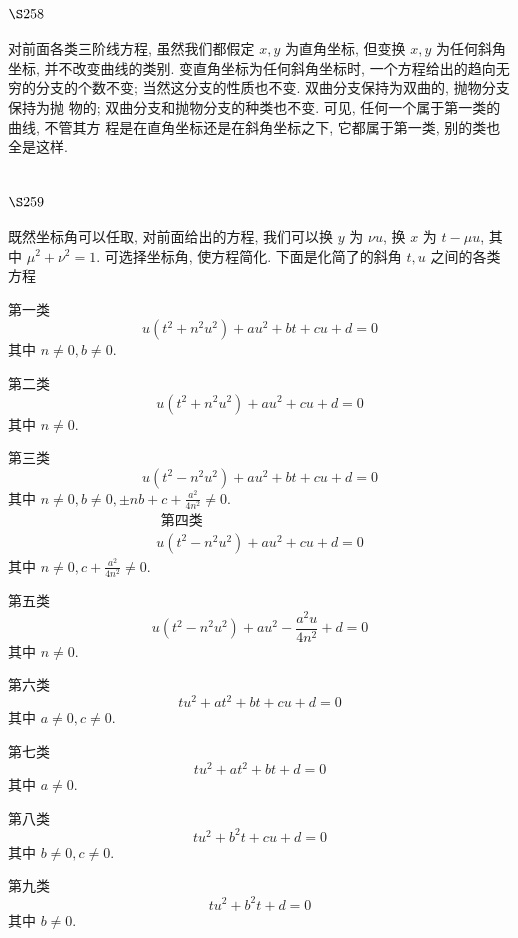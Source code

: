 \section{$\S 258$}

对前面各类三阶线方程, 虽然我们都假定 $x, y$ 为直角坐标, 但变换 $x, y$ 为任何斜角 坐标, 并不改变曲线的类别. 变直角坐标为任何斜角坐标时, 一个方程给出的趋向无穷的分支的个数不变; 当然这分支的性质也不变. 双曲分支保持为双曲的, 抛物分支保持为抛 物的; 双曲分支和抛物分支的种类也不变. 可见, 任何一个属于第一类的曲线, 不管其方 程是在直角坐标还是在斜角坐标之下, 它都属于第一类, 别的类也全是这样.

\section{$\S 259$}

既然坐标角可以任取, 对前面给出的方程, 我们可以换 $y$ 为 $\nu u$, 换 $x$ 为 $t-\mu u$, 其中 $\mu^{2}+\nu^{2}=1$. 可选择坐标角, 使方程简化. 下面是化简了的斜角 $t, u$ 之间的各类方程

第一类
\[
u\left(t^{2}+n^{2} u^{2}\right)+a u^{2}+b t+c u+d=0
\]
其中 $n \neq 0, b \neq 0$.

第二类
\[
u\left(t^{2}+n^{2} u^{2}\right)+a u^{2}+c u+d=0
\]
其中 $n \neq 0$.

第三类
\[
u\left(t^{2}-n^{2} u^{2}\right)+a u^{2}+b t+c u+d=0
\]
其中 $n \neq 0, b \neq 0, \pm n b+c+\frac{a^{2}}{4 n^{2}} \neq 0$.
\[
\begin{gathered}
\text { 第四类 } \\
u\left(t^{2}-n^{2} u^{2}\right)+a u^{2}+c u+d=0
\end{gathered}
\]
其中 $n \neq 0, c+\frac{a^{2}}{4 n^{2}} \neq 0$.

第五类
\[
u\left(t^{2}-n^{2} u^{2}\right)+a u^{2}-\frac{a^{2} u}{4 n^{2}}+d=0
\]
其中 $n \neq 0$.

第六类
\[
t u^{2}+a t^{2}+b t+c u+d=0
\]
其中 $a \neq 0, c \neq 0$.

第七类
\[
t u^{2}+a t^{2}+b t+d=0
\]
其中 $a \neq 0$.

第八类
\[
t u^{2}+b^{2} t+c u+d=0
\]
其中 $b \neq 0, c \neq 0$.

第九类
\[
t u^{2}+b^{2} t+d=0
\]
其中 $b \neq 0$. 

\author{
第十类 \\ $t u^{2}-b^{2} t+c u+d=0$
}

